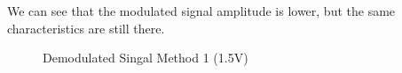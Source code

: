 \documentclass[12pt]{article}
\begin{document}
We can see that the modulated signal amplitude is lower, but the same characteristics are still there.
\begin{figure}[H]
    \centering
    \caption{Demodulated Singal Method 1 (1.5V)}
\end{figure}
\end{document}
